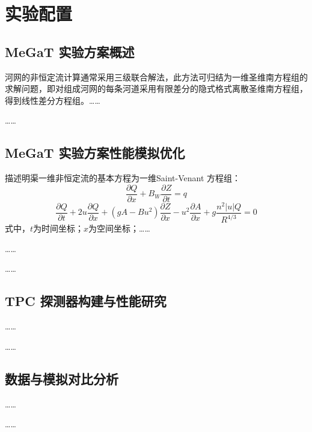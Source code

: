 \chapter{实验配置}
\label{chap:inverseproblem}
\section{MeGaT 实验方案概述}
河网的非恒定流计算通常采用三级联合解法，此方法可归结为一维圣维南方程组的求解问题，即对组成河网的每条河道采用有限差分的隐式格式离散圣维南方程组，得到线性差分方程组。……\par
……
\section{MeGaT 实验方案性能模拟优化}
描述明渠一维非恒定流的基本方程为一维Saint-Venant 方程组：
\begin{equation}
	\frac{\partial Q}{\partial x}+B_{W}\frac{\partial Z}{\partial t}=q
\end{equation}
\begin{equation}
	\frac{\partial Q}{\partial t}+2u\frac{\partial Q}{\partial x}+(gA-Bu^{2})\frac{\partial Z}{\partial x}-u^{2}\frac{\partial A}{\partial x}+g\frac{n^{2} |u|Q}{R^{4/3}}=0
\end{equation}
\noindent 式中，$t$为时间坐标；$x$为空间坐标；……\par
……\par
……

\section{ TPC 探测器构建与性能研究}
……\par
……

\section{数据与模拟对比分析}
……\par
……


